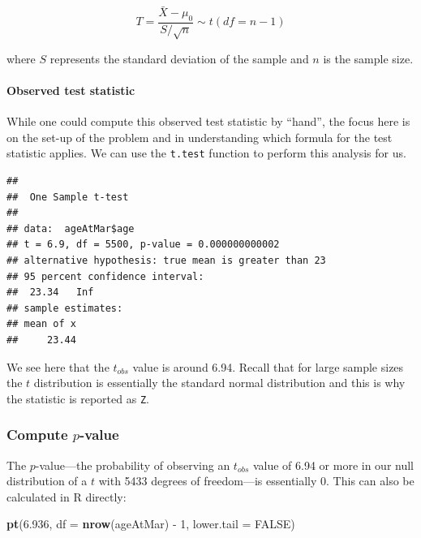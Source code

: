 \documentclass[]{tufte-book}
\newenvironment{Shaded}{\begin{snugshade}}{\end{snugshade}}
\newcommand{\KeywordTok}[1]{\textcolor[rgb]{0.13,0.29,0.53}{\textbf{{#1}}}}
\newcommand{\DataTypeTok}[1]{\textcolor[rgb]{0.13,0.29,0.53}{{#1}}}
\newcommand{\DecValTok}[1]{\textcolor[rgb]{0.00,0.00,0.81}{{#1}}}
\newcommand{\FloatTok}[1]{\textcolor[rgb]{0.00,0.00,0.81}{{#1}}}
\newcommand{\StringTok}[1]{\textcolor[rgb]{0.31,0.60,0.02}{{#1}}}
\newcommand{\OtherTok}[1]{\textcolor[rgb]{0.56,0.35,0.01}{{#1}}}
\newcommand{\NormalTok}[1]{{#1}}
\begin{document}
\[ T =\dfrac{ \bar{X} - \mu_0}{ S / \sqrt{n} } \sim t (df = n - 1) \]

where \(S\) represents the standard deviation of the sample and \(n\) is
the sample size.

\paragraph{Observed test statistic}\label{observed-test-statistic}

While one could compute this observed test statistic by ``hand'', the
focus here is on the set-up of the problem and in understanding which
formula for the test statistic applies. We can use the \texttt{t.test}
function to perform this analysis for us.

\begin{Shaded}
\end{Shaded}

\begin{verbatim}
## 
##  One Sample t-test
## 
## data:  ageAtMar$age
## t = 6.9, df = 5500, p-value = 0.000000000002
## alternative hypothesis: true mean is greater than 23
## 95 percent confidence interval:
##  23.34   Inf
## sample estimates:
## mean of x 
##     23.44
\end{verbatim}

We see here that the \(t_{obs}\) value is around 6.94. Recall that for
large sample sizes the \(t\) distribution is essentially the standard
normal distribution and this is why the statistic is reported as
\texttt{Z}.

\subsubsection{\texorpdfstring{Compute
\(p\)-value}{Compute p-value}}\label{compute-p-value}

The \(p\)-value---the probability of observing an \(t_{obs}\) value of
6.94 or more in our null distribution of a \(t\) with 5433 degrees of
freedom---is essentially 0. This can also be calculated in R directly:

\begin{Shaded}
\begin{Highlighting}[]
\KeywordTok{pt}\NormalTok{(}\FloatTok{6.936}\NormalTok{, }\DataTypeTok{df =} \KeywordTok{nrow}\NormalTok{(ageAtMar) -}\StringTok{ }\DecValTok{1}\NormalTok{, }\DataTypeTok{lower.tail =} \OtherTok{FALSE}\NormalTok{)}
\end{Highlighting}
\end{Shaded}
\end{document}
